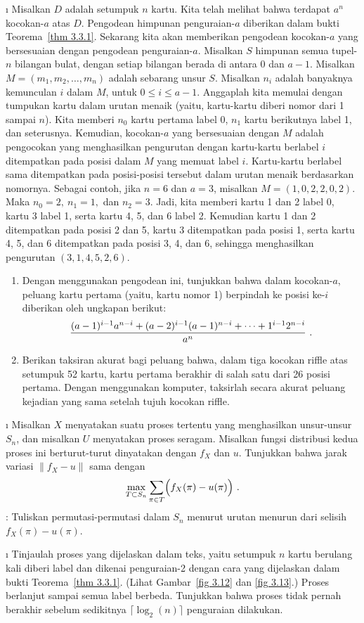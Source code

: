 \begin{LJSItem}
\i\label{exer 3.3.3} Misalkan $D$ adalah setumpuk $n$ kartu.  Kita telah melihat bahwa terdapat
$a^n$ kocokan-$a$ atas $D$.  Pengodean himpunan penguraian-$a$ diberikan dalam bukti
Teorema~\ref{thm 3.3.1}.  Sekarang kita akan memberikan pengodean kocokan-$a$ yang
bersesuaian dengan pengodean penguraian-$a$.  Misalkan $S$ himpunan semua tupel-$n$
bilangan bulat, dengan setiap bilangan berada di antara 0 dan $a-1$.  Misalkan $M =
(m_1, m_2, \ldots, m_n)$ adalah sebarang unsur $S$.  Misalkan $n_i$ adalah banyaknya kemunculan
$i$ dalam $M$, untuk $0 \le i \le a-1$.  Anggaplah kita memulai dengan tumpukan kartu
dalam urutan menaik (yaitu, kartu-kartu diberi nomor dari 1 sampai $n$).  Kita memberi
$n_0$ kartu pertama label 0, $n_1$ kartu berikutnya label 1, dan seterusnya.
Kemudian, kocokan-$a$ yang bersesuaian dengan $M$ adalah pengocokan yang menghasilkan
pengurutan dengan kartu-kartu berlabel $i$ ditempatkan pada posisi dalam $M$ yang memuat
label $i$.  Kartu-kartu berlabel sama ditempatkan pada posisi-posisi tersebut dalam
urutan menaik berdasarkan nomornya.  Sebagai contoh, jika $n = 6$ dan $a = 3$, misalkan
$M = (1, 0, 2, 2, 0, 2)$.  Maka $n_0 = 2,\ n_1 = 1,$ dan $n_2 = 3$.  Jadi, kita memberi
kartu 1 dan 2 label 0, kartu 3 label 1, serta kartu 4, 5, dan 6 label 2.
Kemudian kartu 1 dan 2 ditempatkan pada posisi 2 dan 5, kartu 3 ditempatkan pada posisi 1,
serta kartu 4, 5, dan 6 ditempatkan pada posisi 3, 4, dan 6, sehingga menghasilkan
pengurutan $(3, 1, 4, 5, 2, 6)$.
\begin{enumerate}
\item Dengan menggunakan pengodean ini, tunjukkan bahwa dalam kocokan-$a$, peluang kartu
pertama (yaitu, kartu nomor 1) berpindah ke posisi ke-$i$ diberikan oleh ungkapan berikut:
$$ {{(a-1)^{i-1}a^{n-i} + (a-2)^{i-1}(a-1)^{n-i} + \cdots + 1^{i-1}2^{n-i}}\over{a^n}}\ .
$$
\item Berikan taksiran akurat bagi peluang bahwa, dalam tiga kocokan riffle atas setumpuk
52 kartu, kartu pertama berakhir di salah satu dari 26 posisi pertama.  Dengan menggunakan
komputer, taksirlah secara akurat peluang kejadian yang sama setelah tujuh kocokan riffle.
\end{enumerate}

\i\label{exer 3.3.4} Misalkan $X$ menyatakan suatu proses tertentu yang menghasilkan
unsur-unsur $S_n$, dan misalkan $U$ menyatakan proses seragam.  Misalkan fungsi distribusi
kedua proses ini berturut-turut dinyatakan dengan $f_X$ dan $u$.  Tunjukkan bahwa jarak
variasi
\newline	
$\parallel f_X - u\parallel$ sama dengan
$$\max_{T \subset S_n} \sum_{\pi \in T} \Bigl(f_X(\pi) - u(\pi)\Bigr)\ .$$ 
:
Tuliskan permutasi-permutasi dalam $S_n$ menurut urutan menurun dari selisih $f_X(\pi) -
u(\pi)$.

\i\label{exer 3.3.5} Tinjaulah proses yang dijelaskan dalam teks, yaitu setumpuk $n$
kartu berulang kali diberi label dan dikenai penguraian-2 dengan cara yang dijelaskan
dalam bukti Teorema~\ref{thm 3.3.1}.  (Lihat Gambar~\ref{fig 3.12} dan
\ref{fig 3.13}.)  Proses berlanjut sampai semua label berbeda.  Tunjukkan bahwa proses
tidak pernah berakhir sebelum sedikitnya $\lceil \log_2(n) \rceil$ penguraian dilakukan.
\end{LJSItem}
